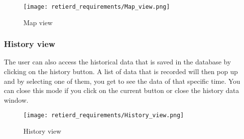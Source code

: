 \documentclass[../document]{subfiles}
\begin{document}
\begin{figure}[H]
	\centering
	\texttt{[image: retierd\_requirements/Map\_view.png]}
	\caption{Map view}
\end{figure}

\subsubsection{History view}
The user can also access the historical data that is saved in the database by clicking on the history button. A list of data that is recorded will then pop up and by selecting one of them, you get to see the data of that specific time. You can close this mode if you click on the current button or close the history data window.

\begin{figure}[H]
	\centering
	\texttt{[image: retierd\_requirements/History\_view.png]}
	\caption{History view}
\end{figure}
\end{document}
